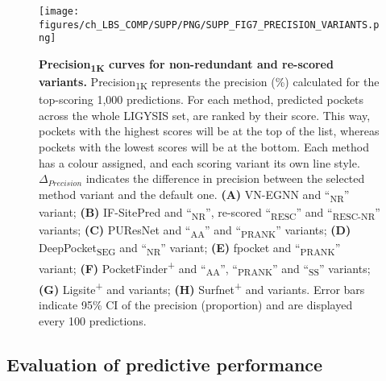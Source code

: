 \begin{figure}[ht!]
    \centering
    \texttt{[image: figures/ch\_LBS\_COMP/SUPP/PNG/SUPP\_FIG7\_PRECISION\_VARIANTS.png]}
    \caption[Precision\textsubscript{1K} curves for non-redundant and re-scored variants]{\textbf{Precision\textsubscript{1K} curves for non-redundant and re-scored variants.}  Precision\textsubscript{1K} represents the precision (\%) calculated for the top-scoring 1,000 predictions. For each method, predicted pockets across the whole LIGYSIS set, are ranked by their score. This way, pockets with the highest scores will be at the top of the list, whereas pockets with the lowest scores will be at the bottom. Each method has a colour assigned, and each scoring variant its own line style. $\Delta_{Precision}$ indicates the difference in precision between the selected method variant and the default one.  \textbf{(A)} VN-EGNN and ``\textsubscript{NR}'' variant; \textbf{(B)} IF-SitePred and ``\textsubscript{NR}'', re-scored ``\textsubscript{RESC}'' and ``\textsubscript{RESC-NR}'' variants; \textbf{(C)} PUResNet and ``\textsubscript{AA}'' and ``\textsubscript{PRANK}'' variants; \textbf{(D)} DeepPocket\textsubscript{SEG} and ``\textsubscript{NR}'' variant; \textbf{(E)} fpocket and ``\textsubscript{PRANK}'' variant; \textbf{(F)} PocketFinder\textsuperscript{+} and ``\textsubscript{AA}'', ``\textsubscript{PRANK}'' and ``\textsubscript{SS}'' variants; \textbf{(G)} Ligsite\textsuperscript{+} and variants; \textbf{(H)} Surfnet\textsuperscript{+} and variants. Error bars indicate 95\% CI of the precision (proportion) and are displayed every 100 predictions.}
    \label{fig:pocket_precision_variants}
\end{figure}

\FloatBarrier

\subsection{Evaluation of predictive performance}

